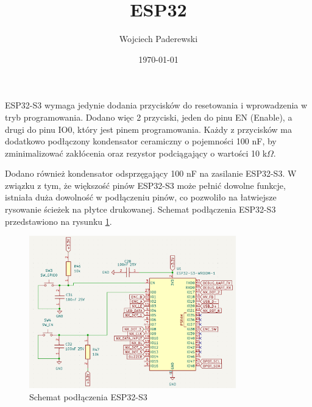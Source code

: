 \documentclass[../../main.tex]{subfiles}
\author{Wojciech Paderewski}
\date{\today}
\title{ESP32}
\begin{document}
ESP32-S3 wymaga jedynie dodania przycisków do resetowania i wprowadzenia w tryb programowania.
Dodano więc 2 przyciski, jeden do pinu EN (Enable), a drugi do pinu IO0, który jest pinem programowania. 
Każdy z przycisków ma dodatkowo podłączony kondensator ceramiczny o pojemności 100 nF, by zminimalizować zakłócenia oraz
rezystor podciągający o wartości 10 k$\Omega$.

Dodano również kondensator odsprzęgający 100 nF na zasilanie ESP32-S3. W związku z tym, że większość pinów ESP32-S3 może 
pełnić dowolne funkcje, istniała duża dowolność w podłączeniu pinów, co pozwoliło na łatwiejsze rysowanie ścieżek na płytce drukowanej.
Schemat podłączenia ESP32-S3 przedstawiono na rysunku \ref{fig:esp32}.

\begin{figure}[H]
    \centering
    \includegraphics[width=0.8\textwidth]{ESP.png}
    \caption{Schemat podłączenia ESP32-S3}
    \label{fig:esp32}
\end{figure}
\end{document}
